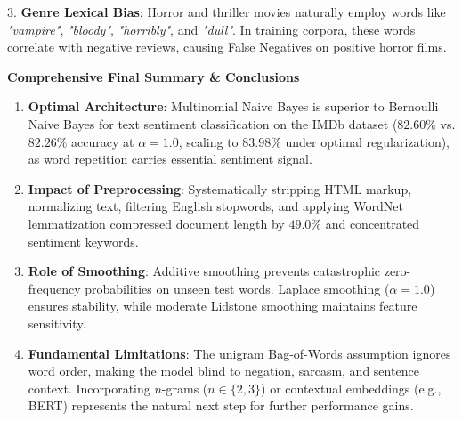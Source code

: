 \documentclass[12pt]{article}
\begin{document}
3. \textbf{Genre Lexical Bias}: Horror and thriller movies naturally employ words like \textit{"vampire"}, \textit{"bloody"}, \textit{"horribly"}, and \textit{"dull"}. In training corpora, these words correlate with negative reviews, causing False Negatives on positive horror films.

\vspace{0.4cm}


\textbf{Comprehensive Final Summary \& Conclusions}

\begin{enumerate}
    \item \textbf{Optimal Architecture}: Multinomial Naive Bayes is superior to Bernoulli Naive Bayes for text sentiment classification on the IMDb dataset ($82.60\%$ vs. $82.26\%$ accuracy at $\alpha=1.0$, scaling to $83.98\%$ under optimal regularization), as word repetition carries essential sentiment signal.
    \item \textbf{Impact of Preprocessing}: Systematically stripping HTML markup, normalizing text, filtering English stopwords, and applying WordNet lemmatization compressed document length by $49.0\%$ and concentrated sentiment keywords.
    \item \textbf{Role of Smoothing}: Additive smoothing prevents catastrophic zero-frequency probabilities on unseen test words. Laplace smoothing ($\alpha=1.0$) ensures stability, while moderate Lidstone smoothing maintains feature sensitivity.
    \item \textbf{Fundamental Limitations}: The unigram Bag-of-Words assumption ignores word order, making the model blind to negation, sarcasm, and sentence context. Incorporating $n$-grams ($n \in \{2, 3\}$) or contextual embeddings (e.g., BERT) represents the natural next step for further performance gains.
\end{enumerate}
\end{document}

